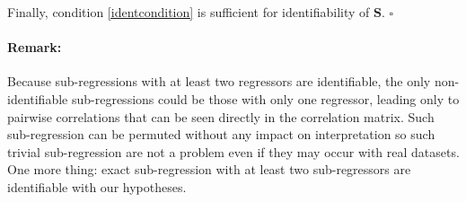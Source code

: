 \documentclass[11pt,a4paper]{article}
\begin{document}
Finally, condition \ref{identcondition} is sufficient for identifiability of $\boldsymbol{S}$.
  	$\square$		
	
\paragraph{Remark:} Because sub-regressions with at least two regressors are identifiable, 
the only non-identifiable sub-regressions could be those with only one regressor, leading only to pairwise correlations that can be seen directly in the correlation matrix. Such sub-regression can be permuted without any impact on interpretation so such trivial sub-regression are not a problem even if they may occur with real datasets. One more thing: exact sub-regression with at least two sub-regressors are identifiable with our hypotheses. 	

	
\end{document}
